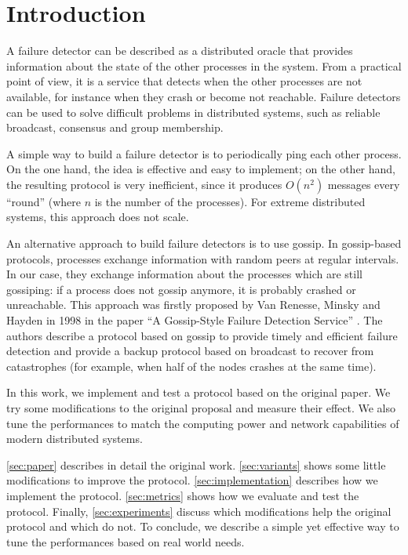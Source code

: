 \section{Introduction}
\label{sec:introduction}

A failure detector can be described as a distributed oracle that provides information about the state of the other processes in the system.
From a practical point of view, it is a service that detects when the other processes are not available, for instance when they crash or become not reachable.
Failure detectors can be used to solve difficult problems in distributed systems, such as reliable broadcast, consensus and group membership.

A simple way to build a failure detector is to periodically ping each other process.
On the one hand, the idea is effective and easy to implement; on the other hand, the resulting protocol is very inefficient, since it produces $O(n^2)$ messages every ``round'' (where $n$ is the number of the processes).
For extreme distributed systems, this approach does not scale.

An alternative approach to build failure detectors is to use gossip.
In gossip-based protocols, processes exchange information with random peers at regular intervals.
In our case, they exchange information about the processes which are still gossiping:
if a process does not gossip anymore, it is probably crashed or unreachable.
This approach was firstly proposed by Van Renesse, Minsky and Hayden in 1998 in the paper ``A Gossip-Style Failure Detection Service'' \cite{gsfd}.
The authors describe a protocol based on gossip to provide timely and efficient failure detection and provide a backup protocol based on broadcast to recover from catastrophes (for example, when half of the nodes crashes at the same time).

In this work, we implement and test a protocol based on the original paper.
We try some modifications to the original proposal and measure their effect.
We also tune the performances to match the computing power and network capabilities of modern distributed systems.

\cref{sec:paper} describes in detail the original work.
\cref{sec:variants} shows some little modifications to improve the protocol.
\cref{sec:implementation} describes how we implement the protocol.
\cref{sec:metrics} shows how we evaluate and test the protocol.
Finally, \cref{sec:experiments} discuss which modifications help the original protocol and which do not.
To conclude, we describe a simple yet effective way to tune the performances based on real world needs.
